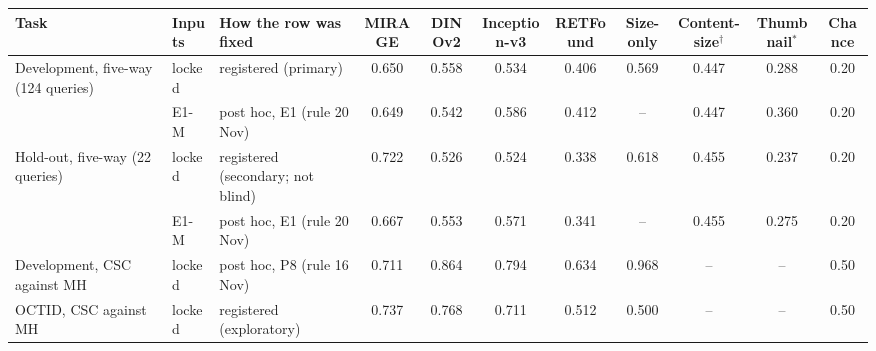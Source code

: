 \begin{tabular}{@{}lllcccccccc@{}}
\toprule
Task & Inputs & How the row was fixed & MIRAGE & DINOv2 & Inception-v3 & RETFound & Size-only & Content-size$^{\dagger}$ & Thumbnail$^{*}$ & Chance \\
\midrule
Development, five-way (124 queries) & locked & registered (primary) & 0.650 & 0.558 & 0.534 & 0.406 & 0.569 & 0.447 & 0.288 & 0.20 \\
 & E1-M & post hoc, E1 (rule 20 Nov) & 0.649 & 0.542 & 0.586 & 0.412 & -- & 0.447 & 0.360 & 0.20 \\
\addlinespace[2pt]
Hold-out, five-way (22 queries) & locked & registered (secondary; not blind) & 0.722 & 0.526 & 0.524 & 0.338 & 0.618 & 0.455 & 0.237 & 0.20 \\
 & E1-M & post hoc, E1 (rule 20 Nov) & 0.667 & 0.553 & 0.571 & 0.341 & -- & 0.455 & 0.275 & 0.20 \\
\addlinespace[2pt]
Development, CSC against MH & locked & post hoc, P8 (rule 16 Nov) & 0.711 & 0.864 & 0.794 & 0.634 & 0.968 & -- & -- & 0.50 \\
OCTID, CSC against MH & locked & registered (exploratory) & 0.737 & 0.768 & 0.711 & 0.512 & 0.500 & -- & -- & 0.50 \\
\bottomrule
\end{tabular}
